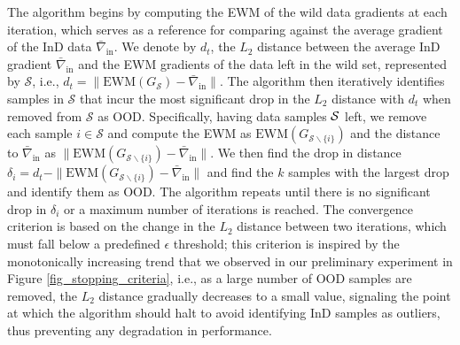 \documentclass[10pt]{article} %
\theoremstyle{plain}
\theoremstyle{definition}
\begin{document}
The algorithm begins by computing the EWM of the wild data gradients at each iteration, which serves as a reference for comparing against the average gradient of the InD data $\bar{\nabla}_{\text{in}}$.
We denote by $d_{t}$, the $L_{2}$ distance between the average InD gradient $\bar{\nabla}_{\text{in}}$ and the EWM gradients of the data left in the wild set, represented by $\mathcal{S}$, i.e., $d_t = \|\text{EWM}(G_{\mathcal{S}}) - \bar{\nabla}_{\text{in}}\|$. 
The algorithm then iteratively identifies samples in $\mathcal{S}$ that incur the most significant drop in the $L_{2}$ distance with $d_t$ when removed from $\mathcal{S}$ as OOD. Specifically, having data samples $\cal S$ left, we remove each sample $i \in \mathcal{S}$ and compute the EWM as $\text{EWM}(G_{\mathcal{S} \backslash \{i\}})$ and the distance to $\bar{\nabla}_{\text{in}}$ as $\|\text{EWM}(G_{\mathcal{S} \backslash \{i\}}) - \bar{\nabla}_{\text{in}}\|$. We then find the drop in distance $\delta_{i} = d_{t} - \|\text{EWM}(G_{\mathcal{S} \backslash \{i\}}) - \bar{\nabla}_{\text{in}}\|$ and find the $k$ samples with the largest drop and identify them as OOD. The algorithm repeats until there is no significant drop in $\delta_{i}$ or a maximum number of iterations is reached.
The convergence criterion is based on the change in the $L_2$ distance between two iterations, which must fall below a predefined $\epsilon$ threshold; this criterion is inspired by the monotonically increasing trend that we observed in our preliminary experiment in Figure \ref{fig_stopping_criteria}, i.e.,
as a large number of OOD samples are removed, the $L_2$ distance gradually decreases to a small value, signaling the point at which the algorithm should halt to avoid identifying InD samples as outliers, thus preventing any degradation in performance.
\end{document}
